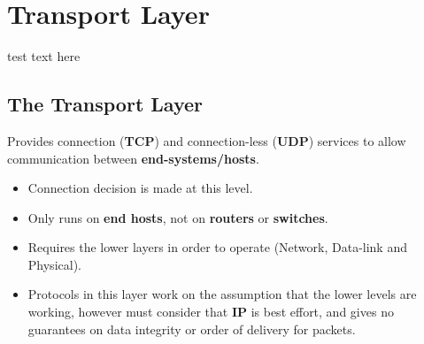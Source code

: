 \chapter{Transport Layer}

\begin{definitionbox}{test}
    text here
\end{definitionbox}

\section{The Transport Layer}
Provides connection (\textbf{TCP}) and connection-less (\textbf{UDP}) services to allow communication between \textbf{end-systems/hosts}.
\begin{itemize}
    \setlength\itemsep{0em}
    \item Connection decision is made at this level.
    \item Only runs on \textbf{end hosts}, not on \textbf{routers} or \textbf{switches}.
    \item Requires the lower layers in order to operate (Network, Data-link and Physical).
    \item Protocols in this layer work on the assumption that the lower levels are working, however must consider that \textbf{IP} is best effort, and gives no guarantees on data integrity or order of delivery for packets.
\end{itemize}

